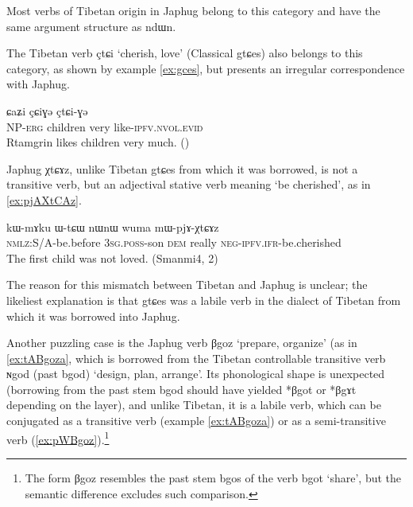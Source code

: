 \documentclass[oldfontcommands,oneside,a4paper,11pt]{article}
\newcommand{\ipa}[1]{{\phon \mbox{#1}}} %
\begin{document}
Most verbs of Tibetan origin in Japhug belong to this category and have the same argument structure as \ipa{ndɯn}. 



The Tibetan verb \ipa{çtɕi} `cherish, love' (Classical \ipa{gtɕes}) also belongs to this category, as shown by example \ref{ex:gces}, but presents an irregular correspondence with Japhug.

\begin{exe}
\ex \label{ex:gces}
\gll \ipa{ʂtamɖʐən-ɣə}  \ipa{ɕaʑi} \ipa{çɕiɣə}  \ipa{çtɕi-ɣə} \\
NP-\textsc{erg} children very like-\textsc{ipfv.nvol.evid} \\
\glt Rtamgrin likes children very much. (\citealt[86:186]{haller04themchen})
\end{exe}

Japhug \ipa{χtɕɤz}, unlike Tibetan \ipa{gtɕes} from which it was borrowed, is not a transitive verb, but an adjectival stative verb meaning `be cherished', as in \ref{ex:pjAXtCAz}. 

\begin{exe}
\ex \label{ex:pjAXtCAz}
\gll
\ipa{kɯ-mɤku} 	\ipa{ɯ-tɕɯ} 	\ipa{nɯnɯ} 	\ipa{wuma} 	\ipa{mɯ-pjɤ-χtɕɤz} \\
\textsc{nmlz}:S/A-be.before \textsc{3sg.poss}-son \textsc{dem} really \textsc{neg-ipfv.ifr}-be.cherished \\
\glt The first child was not loved. (Smanmi4, 2)
\end{exe}

The reason for this mismatch between Tibetan and Japhug is unclear; the likeliest explanation is that \ipa{gtɕes} was a labile verb in the dialect of Tibetan from which it was borrowed into Japhug.


Another puzzling case is the Japhug verb \ipa{βgoz} `prepare, organize' (as in \ref{ex:tABgoza}, which is borrowed from the Tibetan controllable transitive verb \ipa{ɴgod} (past \ipa{bgod}) `design, plan, arrange'. Its phonological shape is unexpected (borrowing from the past stem \ipa{bgod} should have yielded *\ipa{βgot} or *\ipa{βgɤt} depending on the layer), and unlike Tibetan, it is a labile verb, which can be conjugated as a transitive verb (example \ref{ex:tABgoza}) or as a semi-transitive verb (\ref{ex:pWBgoz}).\footnote{The form \ipa{βgoz} resembles the past stem \ipa{bgos} of the verb \ipa{bgot} `share', but the semantic difference excludes such comparison.} 
\end{document}
